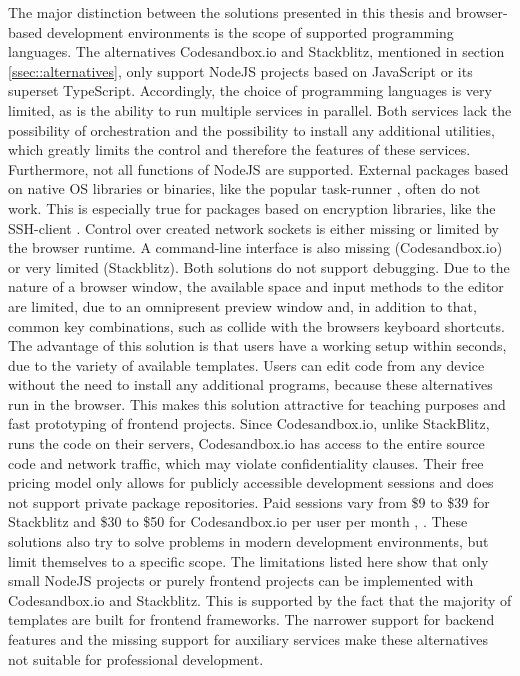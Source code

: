         The major distinction between the solutions presented in this thesis and browser-based development environments is the scope of supported programming languages. The alternatives Codesandbox.io and Stackblitz, mentioned in section \ref{ssec::alternatives}, only support NodeJS projects based on JavaScript or its superset TypeScript. Accordingly, the choice of programming languages is very limited, as is the ability to run multiple services in parallel. Both services lack the possibility of orchestration and the possibility to install any additional utilities, which greatly limits the control and therefore the features of these services. \newline
        Furthermore, not all functions of NodeJS are supported. External packages based on native \ac{OS} libraries or binaries, like the popular task-runner , often do not work. This is especially true for packages based on encryption libraries, like the \ac{SSH}-client . Control over created network sockets is either missing or limited by the browser runtime. A command-line interface is also missing (Codesandbox.io) or very limited (Stackblitz). Both solutions do not support debugging. Due to the nature of a browser window, the available space and input methods to the editor are limited, due to an omnipresent preview window and, in addition to that, common key combinations, such as  collide with the browsers keyboard shortcuts.\newline
        The advantage of this solution is that users have a working setup within seconds, due to the variety of available templates. Users can edit code from any device without the need to install any additional programs, because these alternatives run in the browser. This makes this solution attractive for teaching purposes and fast prototyping of frontend projects.\newline
        Since Codesandbox.io, unlike StackBlitz, runs the code on their servers, Codesandbox.io has access to the entire source code and network traffic, which may violate confidentiality clauses. Their free pricing model only allows for publicly accessible development sessions and does not support private  package repositories. Paid sessions vary from \$9 to \$39 for Stackblitz and \$30 to \$50 for Codesandbox.io per user per month \cite{stackblitz}, \cite{codesandbox}. \newline
        These solutions also try to solve problems in modern development environments, but limit themselves to a specific scope. The limitations listed here show that only small NodeJS projects or purely frontend projects can be implemented with Codesandbox.io and Stackblitz. This is supported by the fact that the majority of templates are built for frontend frameworks. The narrower support for backend features and the missing support for auxiliary services make these alternatives not suitable for professional development.

